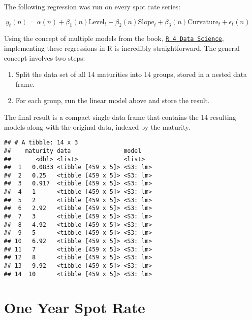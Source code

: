 \documentclass[openany]{book}
\providecommand{\tightlist}{%
  \setlength{\itemsep}{0pt}\setlength{\parskip}{0pt}}
\theoremstyle{definition}
\theoremstyle{definition}
\theoremstyle{definition}
\theoremstyle{remark}
\begin{document}
The following regression was run on every spot rate series:

\[ y_{t}(n) = \alpha(n) + \beta_1(n) \text{Level}_t + \beta_2(n) \text{Slope}_t + \beta_3(n) \text{Curvature}_t + \epsilon_t(n) \]

Using the concept of multiple models from the book,
\href{http://r4ds.had.co.nz/many-models.html}{\texttt{R\ 4\ Data\ Science}},
implementing these regressions in R is incredibly straightforward. The
general concept involves two steps:

\begin{enumerate}
\def\labelenumi{\arabic{enumi})}
\tightlist
\item
  Split the data set of all 14 maturities into 14 groups, stored in a
  nested data frame.
\item
  For each group, run the linear model above and store the result.
\end{enumerate}

\small

\normalsize

\small

\normalsize

The final result is a compact single data frame that contains the 14
resulting models along with the original data, indexed by the maturity.

\small

\begin{verbatim}
## # A tibble: 14 x 3
##    maturity data               model   
##       <dbl> <list>             <list>  
##  1   0.0833 <tibble [459 x 5]> <S3: lm>
##  2   0.25   <tibble [459 x 5]> <S3: lm>
##  3   0.917  <tibble [459 x 5]> <S3: lm>
##  4   1      <tibble [459 x 5]> <S3: lm>
##  5   2      <tibble [459 x 5]> <S3: lm>
##  6   2.92   <tibble [459 x 5]> <S3: lm>
##  7   3      <tibble [459 x 5]> <S3: lm>
##  8   4.92   <tibble [459 x 5]> <S3: lm>
##  9   5      <tibble [459 x 5]> <S3: lm>
## 10   6.92   <tibble [459 x 5]> <S3: lm>
## 11   7      <tibble [459 x 5]> <S3: lm>
## 12   8      <tibble [459 x 5]> <S3: lm>
## 13   9.92   <tibble [459 x 5]> <S3: lm>
## 14  10      <tibble [459 x 5]> <S3: lm>
\end{verbatim}

\normalsize

\hypertarget{one-year-spot-rate}{%
\section{One Year Spot Rate}\label{one-year-spot-rate}}
\end{document}
